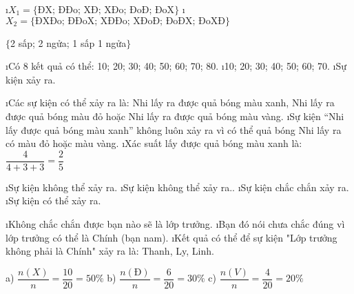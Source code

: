 \begin{Answer}{1}
		\begin{enumerate}[a),leftmargin=*]
			\i $X_1 = \{\text{ĐX; ĐĐo; XĐ; XĐo; ĐoĐ; ĐoX}\}$
			\i $X_2 = \{\text{ĐXĐo; ĐĐoX; XĐĐo; XĐoĐ; ĐoĐX; ĐoXĐ}\}$
		\end{enumerate}
	
\end{Answer}
\begin{Answer}{2}
	$\{$2 sấp; 2 ngửa; 1 sấp 1 ngửa$\}$
	
\end{Answer}
\begin{Answer}{3}
		\begin{enumerate}[a),leftmargin=*]
			\i Có 8 kết quả có thể: 10; 20; 30; 40; 50; 60; 70; 80.
			\i 10; 20; 30; 40; 50; 60; 70.
			\i Sự kiện xảy ra.
		\end{enumerate}
	
\end{Answer}
\begin{Answer}{4}
		\begin{enumerate}[a),leftmargin=*]
			\i Các sự kiện có thể xảy ra là: Nhi lấy ra được quả bóng màu xanh, Nhi lấy ra được quả bóng màu đỏ hoặc Nhi lấy ra được quả bóng màu vàng.
			\i Sự kiện “Nhi lấy được quả bóng màu xanh” không luôn xảy ra vì có thể quả bóng Nhi lấy ra có màu đỏ hoặc màu vàng.
			\i Xác suất lấy được quả bóng màu xanh là: $\dfrac{4}{{4 + 3 + 3}} = \dfrac{2}{5}$
		\end{enumerate}
	
\end{Answer}
\begin{Answer}{5}
		\begin{enumerate}[a),leftmargin=*]
			\i Sự kiện không thể xảy ra.
			\i Sự kiện không thể xảy ra..
			\i Sự kiện chắc chắn xảy ra.
			\i Sự kiện có thể xảy ra.
		\end{enumerate}
	
\end{Answer}
\begin{Answer}{6}
		\begin{enumerate}[a),leftmargin=*]
			\i Không chắc chắn được bạn nào sẽ là lớp trưởng.
			\i Bạn đó nói chưa chắc đúng vì lớp trưởng có thể là Chính (bạn nam).
			\i Kết quả có thể để sự kiện "Lớp trưởng không phải là Chính" xảy ra là: Thanh, Ly, Linh.
		\end{enumerate}
	
\end{Answer}
\begin{Answer}{7}
			a) $\dfrac{n(X)}{n} = \dfrac{10}{20} = 50\%$\quad\quad
			b) $\dfrac{n(Đ)}{n} = \dfrac{6}{20} = 30\%$\quad\quad
			c) $\dfrac{n(V)}{n} = \dfrac{4}{20} = 20\%$
	
\end{Answer}
